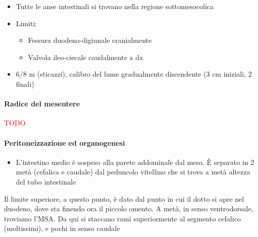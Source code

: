 \documentclass[italian,]{article}
\providecommand{\tightlist}{%
  \setlength{\itemsep}{0pt}\setlength{\parskip}{0pt}}
\newcommand{\TODO}[1]{\textcolor{red}{\textsf{\footnotesize{TODO #1}}}} %
\begin{document}
\begin{itemize}
\tightlist
\item
  Tutte le anse intestinali si trovano nella regione sottomesocolica
\item
  Limiti:

  \begin{itemize}
  \tightlist
  \item
    Fessura duodeno-digiunale cranialmente
  \item
    Valvola ileo-ciecale caudalmente a dx
  \end{itemize}
\item
  6/8 m (sticazzi), calibro del lume gradualmente discendente (3 cm
  iniziali, 2 finali)
\end{itemize}

\hypertarget{radice-del-mesentere}{%
\paragraph{Radice del mesentere}\label{radice-del-mesentere}}

\TODO{}

\hypertarget{peritoneizzazione-ed-organogenesi}{%
\paragraph{Peritoneizzazione ed
organogenesi}\label{peritoneizzazione-ed-organogenesi}}

\begin{itemize}
\tightlist
\item
  L'intestino medio è sospeso alla parete addominale dal meso. È
  separato in 2 metà (cefalica e caudale) dal peduncolo vitellino che si
  trova a metà altezza del tubo intestinale
\end{itemize}

\footnotesize

Il limite superiore, a questo punto, è dato dal punto in cui il dotto si
apre nel duodeno, dove sta finendo ora il piccolo omento. A metà, in
senso ventrodorsale, troviamo l'MSA. Da qui si staccano rami
superiormente al segmento cefalico (moltissimi), e pochi in senso
caudale \normalsize
\end{document}
